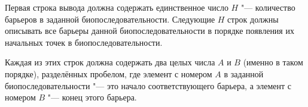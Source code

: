 Первая строка вывода должна содержать единственное число $H$ "--- количество
барьеров в заданной биопоследовательности.
Следующие $H$ строк должны описывать все барьеры данной биопоследовательности
в порядке появления их начальных точек в биопоследовательности.

Каждая из этих строк должна содержать два целых числа $A$ и $B$
(именно в таком порядке), разделённых пробелом,
где элемент с номером $A$ в заданной биопоследовательности "--- это начало
соответствующего барьера, а элемент с номером $B$ "--- конец этого барьера.



